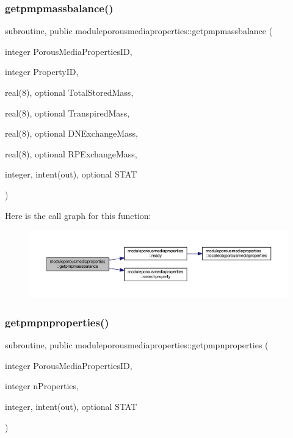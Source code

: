 \subsubsection{\texorpdfstring{getpmpmassbalance()}{getpmpmassbalance()}}
{\footnotesize\ttfamily subroutine, public moduleporousmediaproperties\+::getpmpmassbalance (\begin{DoxyParamCaption}\item[{integer}]{Porous\+Media\+Properties\+ID,  }\item[{integer}]{Property\+ID,  }\item[{real(8), optional}]{Total\+Stored\+Mass,  }\item[{real(8), optional}]{Transpired\+Mass,  }\item[{real(8), optional}]{D\+N\+Exchange\+Mass,  }\item[{real(8), optional}]{R\+P\+Exchange\+Mass,  }\item[{integer, intent(out), optional}]{S\+T\+AT }\end{DoxyParamCaption})}

Here is the call graph for this function\+:\nopagebreak
\begin{figure}[H]
\begin{center}
\leavevmode
\includegraphics[width=350pt]{namespacemoduleporousmediaproperties_aa5824bb6f506f737243ff62a77a6d38c_cgraph}
\end{center}
\end{figure}
\mbox{\label{namespacemoduleporousmediaproperties_a91af77c6bf746b618fd509c6ceb5b42d}} 
\subsubsection{\texorpdfstring{getpmpnproperties()}{getpmpnproperties()}}
{\footnotesize\ttfamily subroutine, public moduleporousmediaproperties\+::getpmpnproperties (\begin{DoxyParamCaption}\item[{integer}]{Porous\+Media\+Properties\+ID,  }\item[{integer}]{n\+Properties,  }\item[{integer, intent(out), optional}]{S\+T\+AT }\end{DoxyParamCaption})}

